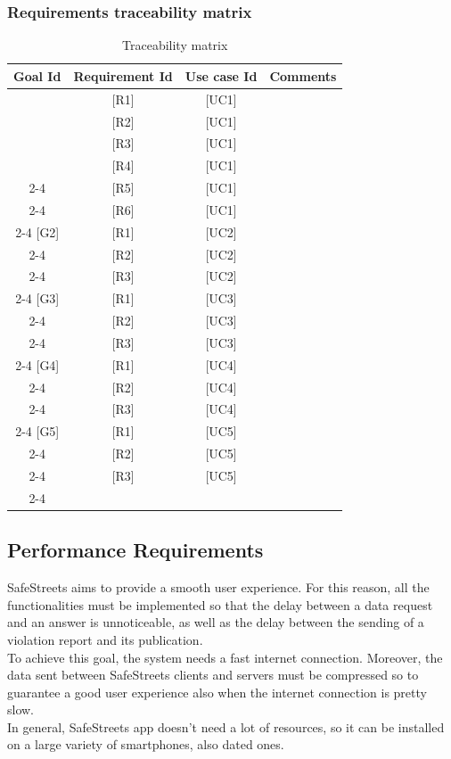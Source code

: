\documentclass{article}
\begin{document}
			\subsubsection{Requirements traceability matrix}
				\begin{longtable}{c | c | c | c}
				\hline\hline
				\textbf{Goal Id} & \textbf{Requirement Id} & \textbf{Use case Id} & \textbf{Comments} \\
				\hline
				\multirow{4}{*}{} [G1] 
				& [R1] & [UC1] & \\ \cline{2-4}
				& [R2] & [UC1] & \\ \cline{2-4}
				& [R3] & [UC1] & \\ \cline{2-4}
				& [R4] & [UC1] & \\ \cline{2-4}
				& [R5] & [UC1] & \\ \cline{2-4}
				& [R6] & [UC1] & \\ \cline{2-4}
				\hline
				\multirow{4}{*}{} [G2] 
				& [R1] & [UC2] & \\ \cline{2-4}
				& [R2] & [UC2] & \\ \cline{2-4}
				& [R3] & [UC2] & \\ \cline{2-4}
				\hline
				\multirow{4}{*}{} [G3] 
				& [R1] & [UC3] & \\ \cline{2-4}
				& [R2] & [UC3] & \\ \cline{2-4}
				& [R3] & [UC3] & \\ \cline{2-4}
				\hline
				\multirow{4}{*}{} [G4] 
				& [R1] & [UC4] & \\ \cline{2-4}
				& [R2] & [UC4] & \\ \cline{2-4}
				& [R3] & [UC4] & \\ \cline{2-4}
				\hline
				\multirow{4}{*}{} [G5] 
				& [R1] & [UC5] & \\ \cline{2-4}
				& [R2] & [UC5] & \\ \cline{2-4}
				& [R3] & [UC5] & \\ \cline{2-4}
				\hline
				\caption{Traceability matrix}
				\label{fig:Traceability matrix}
			\end{longtable}
		\clearpage
		\subsection{Performance Requirements}
			SafeStreets aims to provide a smooth user experience. For this reason, all the functionalities must be implemented so that the delay between a data request and an answer is unnoticeable, as well as the delay between the sending of a violation report and its publication.\\
			To achieve this goal, the system needs a fast internet connection. Moreover, the data sent between SafeStreets clients and servers must be compressed so to guarantee a good user experience also when the internet connection is pretty slow.\\
			In general, SafeStreets app doesn't need a lot of resources, so it can be installed on a large variety of smartphones, also dated ones.
\end{document}
